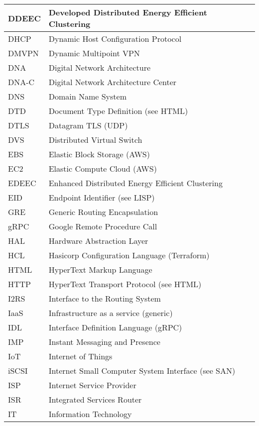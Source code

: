 \begin{longtable}{ll}
  DDEEC		&		Developed Distributed Energy Efficient Clustering		\\ \midrule
  DHCP		&		Dynamic Host Configuration Protocol		\\ \midrule
  DMVPN		&		Dynamic Multipoint VPN		\\ \midrule
  DNA		&		Digital Network Architecture		\\ \midrule
  DNA-C		&		Digital Network Architecture Center		\\ \midrule
  DNS		&		Domain Name System		\\ \midrule
  DTD		&		Document Type Definition (see HTML)		\\ \midrule
  DTLS		&		Datagram TLS (UDP)		\\ \midrule
  DVS		&		Distributed Virtual Switch		\\ \midrule
  EBS		&		Elastic Block Storage (AWS)		\\ \midrule
  EC2		&		Elastic Compute Cloud (AWS)		\\ \midrule
  EDEEC		&		Enhanced Distributed Energy Efficient Clustering		\\ \midrule
  EID		&		Endpoint Identifier (see LISP)		\\ \midrule
  GRE		&		Generic Routing Encapsulation		\\ \midrule
  gRPC		&		Google Remote Procedure Call		\\ \midrule
  HAL		&		Hardware Abstraction Layer		\\ \midrule
  HCL		&		Hasicorp Configuration Language (Terraform)		\\ \midrule
  HTML		&		HyperText Markup Language		\\ \midrule
  HTTP		&		HyperText Transport Protocol (see HTML)		\\ \midrule
  I2RS		&		Interface to the Routing System		\\ \midrule
  IaaS		&		Infrastructure as a service (generic)		\\ \midrule
  IDL		&		Interface Definition Language (gRPC)		\\ \midrule
  IMP		&		Instant Messaging and Presence		\\ \midrule
  IoT		&		Internet of Things		\\ \midrule
  iSCSI		&		Internet Small Computer System Interface (see SAN)		\\ \midrule
  ISP		&		Internet Service Provider		\\ \midrule
  ISR		&		Integrated Services Router		\\ \midrule
  IT		&		Information Technology		\\ \midrule

\end{longtable}
